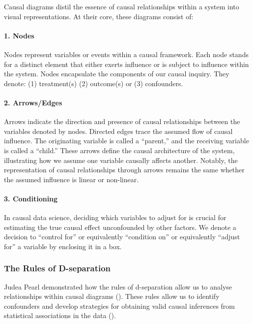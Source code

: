\documentclass[
  singlecolumn]{article}
\let\oldparagraph\paragraph
\renewcommand{\paragraph}[1]{\oldparagraph{#1}\mbox{}}
\begin{document}
Causal diagrams distil the essence of causal relationships within a
system into visual representations. At their core, these diagrams
consist of:

\paragraph{\texorpdfstring{1. \textbf{Nodes}}{1. Nodes}}\label{nodes}

Nodes represent variables or events within a causal framework. Each node
stands for a distinct element that either exerts influence or is subject
to influence within the system. Nodes encapsulate the components of our
causal inquiry. They denote: (1) treatment(s) (2) outcome(s) or (3)
confounders.

\paragraph{\texorpdfstring{2.
\textbf{Arrows/Edges}}{2. Arrows/Edges}}\label{arrowsedges}

Arrows indicate the direction and presence of causal relationships
between the variables denoted by nodes. Directed edges trace the assumed
flow of causal influence. The originating variable is called a
``parent,'' and the receiving variable is called a ``child.'' These
arrows define the causal architecture of the system, illustrating how we
assume one variable causally affects another. Notably, the
representation of causal relationships through arrows remains the same
whether the assumed influence is linear or non-linear.

\paragraph{\texorpdfstring{3.
\textbf{Conditioning}}{3. Conditioning}}\label{conditioning}

In causal data science, deciding which variables to adjust for is
crucial for estimating the true causal effect unconfounded by other
factors. We denote a decision to ``control for'' or equivalently
``condition on'' or equivalently ``adjust for'' a variable by enclosing
it in a box.

\subsubsection{The Rules of
D-separation}\label{the-rules-of-d-separation}

Judea Pearl demonstrated how the rules of d-separation allow us to
analyse relationships within causal diagrams
(). These rules allow us to identify
confounders and develop strategies for obtaining valid causal inferences
from statistical associations in the data
().
\end{document}
